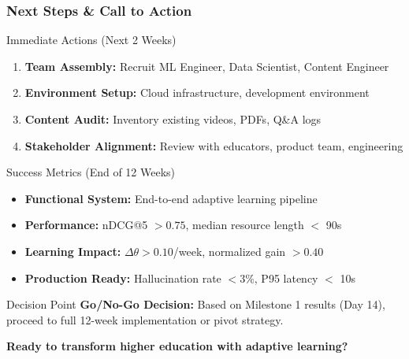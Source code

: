 \documentclass[aspectratio=169]{beamer}
\begin{document}
\begin{frame}
\frametitle{Next Steps \& Call to Action}
\begin{block}{Immediate Actions (Next 2 Weeks)}
\begin{enumerate}
\item \textbf{Team Assembly:} Recruit ML Engineer, Data Scientist, Content Engineer
\item \textbf{Environment Setup:} Cloud infrastructure, development environment
\item \textbf{Content Audit:} Inventory existing videos, PDFs, Q\&A logs
\item \textbf{Stakeholder Alignment:} Review with educators, product team, engineering
\end{enumerate}
\end{block}

\begin{block}{Success Metrics (End of 12 Weeks)}
\begin{itemize}
\item \textbf{Functional System:} End-to-end adaptive learning pipeline
\item \textbf{Performance:} nDCG@5 $> 0.75$, median resource length $<$ 90s
\item \textbf{Learning Impact:} $\Delta\theta > 0.10$/week, normalized gain $> 0.40$
\item \textbf{Production Ready:} Hallucination rate $< 3\%$, P95 latency $<$ 10s
\end{itemize}
\end{block}

\begin{alertblock}{Decision Point}
\textbf{Go/No-Go Decision:} Based on Milestone 1 results (Day 14), proceed to full 12-week implementation or pivot strategy.
\end{alertblock}

\begin{center}
\Large
\textbf{Ready to transform higher education with adaptive learning?}
\end{center}
\end{frame}
\end{document}
